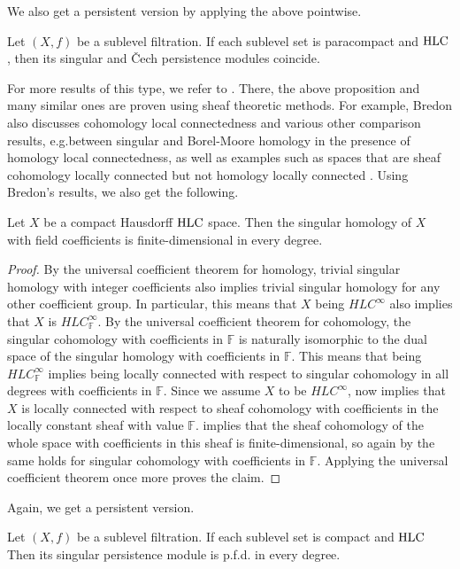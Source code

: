 We also get a persistent version by applying the above pointwise.

\begin{cor}\label{cor:cech_sing_persistent_iso}
	Let $(X, f)$ be a sublevel filtration. If each sublevel set is paracompact and $\mathrm{HLC}$, then its singular and \v{C}ech persistence modules coincide.
\end{cor}

For more results of this type, we refer to \cite{MR1481706}. There, the above proposition \cite[Corollary VI.12.6]{MR1481706} and many similar ones are proven using sheaf theoretic methods.
For example, Bredon also discusses cohomology local connectedness \cite[Section II.17]{MR1481706} and various other comparison results, e.g.\@ between singular and Borel-Moore homology \cite[Corollary V.12.15]{MR1481706} in the presence of homology local connectedness, as well as examples such as spaces that are sheaf cohomology locally connected but not homology locally connected \cite[Example II.17.12]{MR1481706}.
Using Bredon's results, we also get the following.

\begin{prop} \label{prop:fin_dim_sing_hom}
	Let $X$ be a compact Hausdorff $\mathrm{HLC}$ space.
	Then the singular homology of $X$ with field coefficients is finite-dimensional in every degree.
\end{prop}
\begin{proof}
	By the universal coefficient theorem for homology, trivial singular homology with integer coefficients also implies trivial singular homology for any other coefficient group. In particular, this means that $X$ being $HLC^{\infty}$ also implies that $X$ is $HLC^{\infty}_{\mathbb{F}}$. By the universal coefficient theorem for cohomology, the singular cohomology with coefficients in $\mathbb{F}$ is naturally isomorphic to the dual space of the singular homology with coefficients in $\mathbb{F}$. This means that being $HLC^{\infty}_{\mathbb{F}}$ implies being locally connected with respect to singular cohomology in all degrees with coefficients in $\mathbb{F}$. Since we assume $X$ to be $HLC^{\infty}$, \cite[Theorem III.1.1]{MR1481706} now implies that $X$ is locally connected with respect to sheaf cohomology with coefficients in the locally constant sheaf with value $\mathbb{F}$. \cite[Corollary II.17.7]{MR1481706} implies that the sheaf cohomology of the whole space with coefficients in this sheaf is finite-dimensional, so again by \cite[Theorem III.1.1]{MR1481706} the same holds for singular cohomology with coefficients in $\mathbb{F}$. Applying the universal coefficient theorem once more proves the claim.
\end{proof}

Again, we get a persistent version.

\begin{cor}
	Let $(X, f)$ be a sublevel filtration. If each sublevel set is compact and $\mathrm{HLC}$
	Then its singular persistence module is p.f.d. in every degree.
\end{cor}
